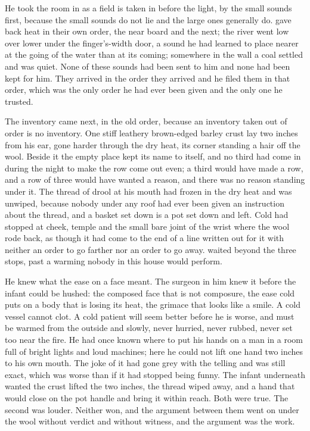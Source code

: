 He took the room in as a field is taken in before the light, by the small sounds first, because the small sounds do not lie and the large ones generally do.  gave back heat in their own order, the near board and the next; the river went low over lower under the finger's-width door, a sound he had learned to place nearer at the going of the water than at its coming; somewhere in the wall a coal settled and was quiet. None of these sounds had been sent to him and none had been kept for him. They arrived in the order they arrived and he filed them in that order, which was the only order he had ever been given and the only one he trusted.

The inventory came next, in the old order, because an inventory taken out of order is no inventory. One stiff leathery brown-edged barley crust lay two inches from his ear, gone harder through the dry heat, its corner standing a hair off the wool. Beside it the empty place kept its name to itself, and no third had come in during the night to make the row come out even; a third would have made a row, and a row of three would have wanted a reason, and there was no reason standing under it. The thread of drool at his mouth had frozen in the dry heat and was unwiped, because nobody under any roof had ever been given an instruction about the thread, and a basket set down is a pot set down and left. Cold had stopped at cheek, temple and the small bare joint of the wrist where the wool rode back, as though it had come to the end of a line written out for it with neither an order to go farther nor an order to go away.  waited beyond the three stops, past a warming nobody in this house would perform.

He knew what the ease on a face meant. The surgeon in him knew it before the infant could be hushed: the composed face that is not composure, the ease cold puts on a body that is losing its heat, the grimace that looks like a smile. A cold vessel cannot clot. A cold patient will seem better before he is worse, and must be warmed from the outside and slowly, never hurried, never rubbed, never set too near the fire. He had once known where to put his hands on a man in a room full of bright lights and loud machines; here he could not lift one hand two inches to his own mouth. The joke of it had gone grey with the telling and was still exact, which was worse than if it had stopped being funny. The infant underneath wanted the crust lifted the two inches, the thread wiped away, and a hand that would close on the pot handle and bring it within reach. Both were true. The second was louder. Neither won, and the argument between them went on under the wool without verdict and without witness, and the argument was the work.

